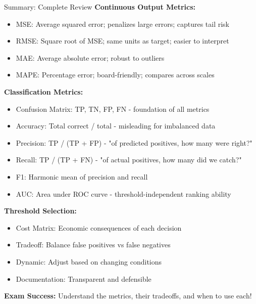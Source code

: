 \documentclass[8pt]{beamer}
\begin{document}
	\begin{frame}{Summary: Complete Review}
		\fontsize{6.5}{7.5}\selectfont
		\textbf{\textcolor{myblue}{Continuous Output Metrics:}}
		\begin{itemize}
			\item \textcolor{myblue}{MSE:} Average squared error; penalizes large errors; captures tail risk
			\item \textcolor{myblue}{RMSE:} Square root of MSE; same units as target; easier to interpret
			\item \textcolor{myblue}{MAE:} Average absolute error; robust to outliers
			\item \textcolor{myblue}{MAPE:} Percentage error; board-friendly; compares across scales
		\end{itemize}
		
		\vspace{0.2cm}
		\textbf{\textcolor{myblue}{Classification Metrics:}}
		\begin{itemize}
			\item \textcolor{myblue}{Confusion Matrix:} TP, TN, FP, FN - foundation of all metrics
			\item \textcolor{myblue}{Accuracy:} Total correct / total - misleading for imbalanced data
			\item \textcolor{myblue}{Precision:} TP / (TP + FP) - "of predicted positives, how many were right?"
			\item \textcolor{myblue}{Recall:} TP / (TP + FN) - "of actual positives, how many did we catch?"
			\item \textcolor{myblue}{F1:} Harmonic mean of precision and recall
			\item \textcolor{myblue}{AUC:} Area under ROC curve - threshold-independent ranking ability
		\end{itemize}
		
		\vspace{0.2cm}
		\textbf{\textcolor{myblue}{Threshold Selection:}}
		\begin{itemize}
			\item \textcolor{myblue}{Cost Matrix:} Economic consequences of each decision
			\item \textcolor{myblue}{Tradeoff:} Balance false positives vs false negatives
			\item \textcolor{myblue}{Dynamic:} Adjust based on changing conditions
			\item \textcolor{myblue}{Documentation:} Transparent and defensible
		\end{itemize}
		
		\vspace{0.2cm}
		\textcolor{myred}{\textbf{Exam Success:}} Understand the metrics, their tradeoffs, and when to use each!
	\end{frame}
	
\end{document}
